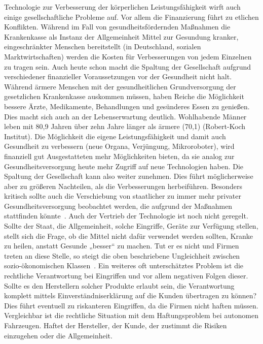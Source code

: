 \documentclass[a4paper,
DIV=13,
12pt,
BCOR=10mm,
department=FakEI,
twoside,
parskip=half,
automark,
]{OTHRartcl}
\begin{document}
Technologie zur Verbesserung der körperlichen Leistungsfähigkeit wirft auch einige gesellschaftliche Probleme auf. Vor allem die Finanzierung führt zu etlichen Konflikten. Während im Fall von gesundheitsfördernden Maßnahmen die Krankenkasse als
Instanz der Allgemeinheit Mittel zur Gesundung kranker, eingeschränkter Menschen bereitstellt (in Deutschland, sozialen Marktwirtschaften) werden die Kosten für Verbesserungen von jedem Einzelnen zu tragen sein. Auch heute schon macht die Spaltung der
Gesellschaft aufgrund verschiedener finanzieller Voraussetzungen vor der Gesundheit nicht halt. Während ärmere Menschen mit der gesundheitlichen Grundversorgung der gesetzlichen Krankenkasse auskommen müssen, haben Reiche die Möglichkeit bessere Ärzte, Medikamente,
Behandlungen und gesünderes Essen zu genießen. Dies macht sich auch an der Lebenserwartung deutlich. Wohlhabende Männer leben mit 80,9 Jahren über zehn Jahre länger als ärmere (70,1) (Robert-Koch Institut). Die Möglichkeit die eigene Leistungsfähigkeit und damit
auch Gesundheit zu verbessern (neue Organa, Verjüngung, Mikroroboter), wird finanziell gut Ausgestatteten mehr Möglichkeiten bieten, da sie analog zur Gesundheitsversorgung heute mehr Zugriff auf neue Technologien haben. Die Spaltung der Gesellschaft kann also weiter
zunehmen. Dies führt möglicherweise aber zu größeren Nachteilen, als die Verbesserungen herbeiführen. Besonders kritisch sollte auch die Verschiebung von staatlicher zu immer mehr privater Gesundheitsversorgung beobachtet werden, die aufgrund der Maßnahmen stattfinden
könnte~\cite{Kahn, Aziz 2009 S.7}. Auch der Vertrieb der Technologie ist noch nicht geregelt. Sollte der Staat, die Allgemeinheit, solche Eingriffe, Geräte zur Verfügung stellen, stellt sich die Frage, ob die Mittel nicht dafür verwendet werden sollten, Kranke zu heilen, anstatt
Gesunde „besser“ zu machen. Tut er es nicht und Firmen treten an diese Stelle, so steigt die oben beschriebene Ungleichheit zwischen sozio-ökonomischen Klassen~\cite{khan_aziz_2019}. Ein weiteres oft unterschätztes Problem ist die rechtliche Verantwortung bei Eingriffen und
vor allem negativen Folgen dieser. Sollte es den Herstellern solcher Produkte erlaubt sein, die Verantwortung komplett mittels Einverständniserklärung auf die Kunden übertragen zu können? Dies führt eventuell zu riskanteren Eingriffen, da die Firmen nicht haften müssen.
Vergleichbar ist die rechtliche Situation mit dem Haftungsproblem bei autonomen Fahrzeugen. Haftet der Hersteller, der Kunde, der zustimmt die Risiken einzugehen oder die Allgemeinheit.
\end{document}
